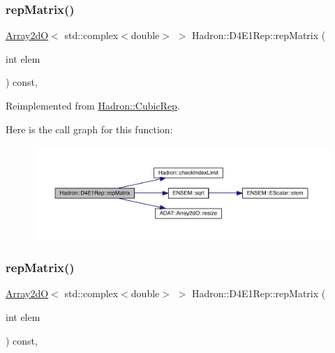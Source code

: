 \subsubsection{\texorpdfstring{repMatrix()}{repMatrix()}\hspace{0.1cm}{\footnotesize\ttfamily [1/3]}}
{\footnotesize\ttfamily \mbox{\hyperlink{classADAT_1_1Array2dO}{Array2dO}}$<$ std\+::complex$<$double$>$ $>$ Hadron\+::\+D4\+E1\+Rep\+::rep\+Matrix (\begin{DoxyParamCaption}\item[{int}]{elem }\end{DoxyParamCaption}) const\hspace{0.3cm}{\ttfamily [inline]}, {\ttfamily [virtual]}}



Reimplemented from \mbox{\hyperlink{structHadron_1_1CubicRep_ac5d7e9e6f4ab1158b5fce3e4ad9e8005}{Hadron\+::\+Cubic\+Rep}}.

Here is the call graph for this function\+:
\nopagebreak
\begin{figure}[H]
\begin{center}
\leavevmode
\includegraphics[width=350pt]{da/d78/structHadron_1_1D4E1Rep_a8a0fcfa06e2a36d6835bab2431654a2f_cgraph}
\end{center}
\end{figure}
\mbox{\label{structHadron_1_1D4E1Rep_a8a0fcfa06e2a36d6835bab2431654a2f}} 
\subsubsection{\texorpdfstring{repMatrix()}{repMatrix()}\hspace{0.1cm}{\footnotesize\ttfamily [2/3]}}
{\footnotesize\ttfamily \mbox{\hyperlink{classADAT_1_1Array2dO}{Array2dO}}$<$ std\+::complex$<$double$>$ $>$ Hadron\+::\+D4\+E1\+Rep\+::rep\+Matrix (\begin{DoxyParamCaption}\item[{int}]{elem }\end{DoxyParamCaption}) const\hspace{0.3cm}{\ttfamily [inline]}, {\ttfamily [virtual]}}



